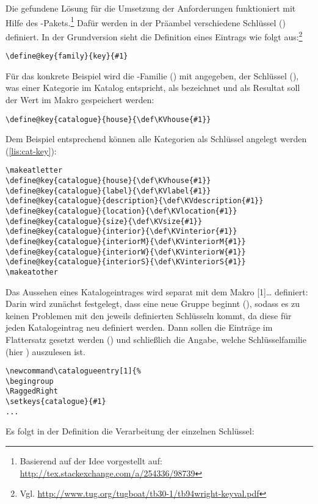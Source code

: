 Die gefundene Lösung für die Umsetzung der Anforderungen funktioniert mit Hilfe des   -Pakets.\footnote{Basierend auf der Idee vorgestellt auf: \url{http://tex.stackexchange.com/a/254336/98739}}
Dafür werden in der Präambel verschiedene Schlüssel () definiert.
In der Grundversion sieht die Definition eines Eintrags wie folgt aus:\footnote{Vgl. \url{http://www.tug.org/tugboat/tb30-1/tb94wright-keyval.pdf}}
\begin{lstlisting}
\define@key{family}{key}{#1}
\end{lstlisting}
Für das konkrete Beispiel wird die -Familie () mit  angegeben,
der Schlüssel (), was einer Kategorie im Katalog entspricht, 
als  bezeichnet und als Resultat soll der Wert im Makro  gespeichert werden:
\begin{lstlisting}[]
\define@key{catalogue}{house}{\def\KVhouse{#1}}
\end{lstlisting}
Dem Beispiel entsprechend können alle Kategorien als Schlüssel angelegt werden (\cref{lis:cat-key}):
\begin{lstlisting}[caption={Definition der Schlüssel},label={lis:cat-key}]
\makeatletter
\define@key{catalogue}{house}{\def\KVhouse{#1}}
\define@key{catalogue}{label}{\def\KVlabel{#1}}
\define@key{catalogue}{description}{\def\KVdescription{#1}}
\define@key{catalogue}{location}{\def\KVlocation{#1}}
\define@key{catalogue}{size}{\def\KVsize{#1}}
\define@key{catalogue}{interior}{\def\KVinterior{#1}}
\define@key{catalogue}{interiorM}{\def\KVinteriorM{#1}}
\define@key{catalogue}{interiorW}{\def\KVinteriorW{#1}}
\define@key{catalogue}{interiorS}{\def\KVinteriorS{#1}}
\makeatother
\end{lstlisting}
Das Aussehen eines Katalogeintrages wird separat mit dem Makro
 [1]{\ldots} 
definiert:
Darin wird zunächst festgelegt,
dass eine neue Gruppe beginnt (), sodass
es zu keinen Problemen mit den jeweils definierten Schlüsseln kommt, 
da diese für jeden Katalogeintrag neu definiert werden.
Dann sollen die  Einträge im Flattersatz gesetzt werden () und schließlich die Angabe,
 welche Schlüsselfamilie (hier ) auszulesen ist.
\begin{lstlisting}[caption={Definition der Katalogeinträge, Anfang},label={lis:cat-1}]
\newcommand\catalogueentry[1]{%
\begingroup
\RaggedRight
\setkeys{catalogue}{#1}
...
\end{lstlisting}
Es folgt in der Definition die Verarbeitung der einzelnen Schlüssel:
